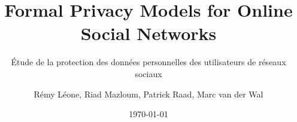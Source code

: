 \author[Léone, Mazloum, Raad, Van der Wal]
	{Rémy Léone, Riad Mazloum, Patrick Raad, Marc van der Wal}

\title{Formal Privacy Models for Online Social Networks}
\subtitle{Étude de la protection des données personnelles des utilisateurs de réseaux sociaux}
\date{\today}
